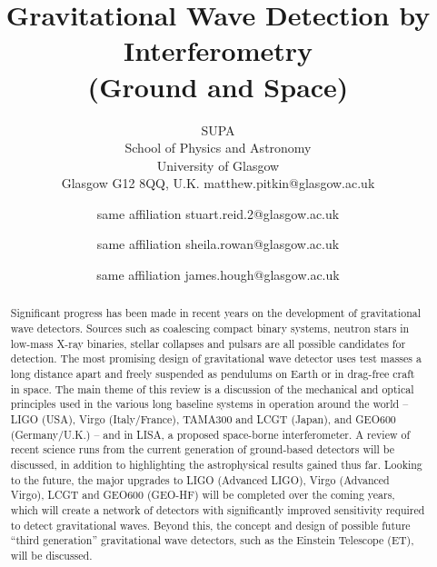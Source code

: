 \documentclass{article}
\begin{document}
\title{Gravitational Wave Detection by Interferometry \\(Ground and Space)}

\author{%
        {SUPA \\
        School of Physics and Astronomy \\
        University of Glasgow \\
        Glasgow G12 8QQ, U.K.}
        {matthew.pitkin@glasgow.ac.uk}
        {}
\and
{}
        {same affiliation}
        {stuart.reid.2@glasgow.ac.uk}
    {}
\and
{}
        {same affiliation}
        {sheila.rowan@glasgow.ac.uk}
        {}
\and
{}
        {same affiliation}
        {james.hough@glasgow.ac.uk}
        {}
}

\date{}
\maketitle


\begin{abstract}
Significant progress has been made in recent years on the development of
gravitational wave detectors. Sources such as coalescing compact binary
systems, neutron stars in low-mass X-ray binaries, stellar collapses and
pulsars are all possible candidates for detection. The most promising design
of gravitational wave detector uses test masses a long distance apart and
freely suspended as pendulums on Earth or in drag-free craft in space.  The
main theme of this review is a discussion of the mechanical and optical
principles used in the various long baseline systems in operation around the
world -- LIGO (USA), Virgo (Italy/France), TAMA300 and LCGT (Japan), and
GEO600 (Germany/U.K.) -- and in LISA, a proposed space-borne interferometer. A
review of recent science runs from the current generation of ground-based
detectors will be discussed, in addition to highlighting the astrophysical
results gained thus far. Looking to the future, the major upgrades to LIGO
(Advanced LIGO), Virgo (Advanced Virgo), LCGT and GEO600 (GEO-HF) will be
completed over the coming years, which will create a network of detectors
with significantly improved sensitivity required to detect gravitational waves.
Beyond this, the concept and design of possible future ``third generation''
gravitational wave detectors, such as the Einstein Telescope (ET), will be
discussed.
\end{abstract}
\end{document}
